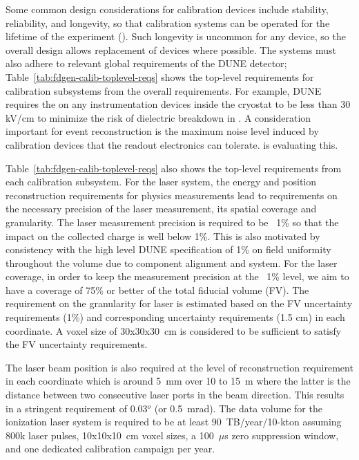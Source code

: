 Some common design considerations for calibration devices include stability, reliability, and longevity, so that calibration systems can be operated for the lifetime of the experiment (\dunelifetime). Such longevity is uncommon for any device, so the overall design allows replacement of devices where possible. The systems must also adhere to relevant global requirements of the DUNE detector; Table~\ref{tab:fdgen-calib-toplevel-reqs} shows the top-level requirements for calibration subsystems from the overall requirements. For example, DUNE requires the \efield  on any instrumentation devices inside the cryostat to be less than 30 kV/cm to minimize the risk of dielectric breakdown in \lar. A consideration important for event reconstruction is the maximum noise level induced by calibration devices that the readout electronics can tolerate.  is evaluating this. 

Table~\ref{tab:fdgen-calib-toplevel-reqs}  also shows the top-level requirements from each calibration subsystem. For the laser system, the energy and position reconstruction requirements for physics measurements lead to requirements on the necessary precision of the laser \efield measurement, its spatial coverage and granularity. The laser \efield measurement precision is required to be ~1\% so that the impact on the collected charge is well below 1\%. This is also motivated by consistency with the high level DUNE specification of 1\% on field uniformity throughout the volume due to component alignment and \hv system. For the laser coverage, in order to keep the \efield measurement precision at the ~1\% level, we aim to have a coverage of 75\% or better of the total fiducial volume (FV). The requirement on the granularity for laser is estimated based on the FV uncertainty requirements (1\%) and corresponding uncertainty requirements (1.5 cm) in each coordinate. A voxel size of \num{30}x\num{30}x\num{30}~cm is considered to be sufficient to satisfy the FV uncertainty requirements. 

The laser beam position is also required at the level of reconstruction requirement in each coordinate which is around 5~mm over 10 to 15~m where the latter is the distance between two consecutive laser ports in the beam direction. This results in a stringent requirement of 0.03$^{o}$ (or 0.5~mrad). The data volume for the ionization laser system is required to be at least 90~TB/year/10-kton assuming 800k laser pulses, \num{10}x\num{10}x\num{10}~cm voxel sizes, a 100~$\mu$s zero suppression window, and one dedicated calibration campaign per year.

